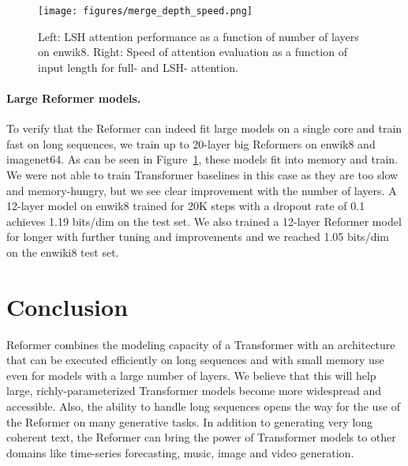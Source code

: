 \begin{figure}[!t]
    \centering
    \texttt{[image: figures/merge\_depth\_speed.png]}
    \caption{Left: LSH attention performance as a function of number of layers on enwik8. 
    Right: Speed of attention evaluation as a function of input length for full- and LSH- attention.}
    \label{fig:layer-curves}
\end{figure}

\paragraph{Large Reformer models.} \label{sec:exp_large}
To verify that the Reformer can indeed fit large models on a single core
and train fast on long sequences, we train up to 20-layer big Reformers on enwik8 and imagenet64.
As can be seen in Figure~\ref{fig:layer-curves}, these models
fit into memory and train. We were not able to train Transformer baselines
in this case as they are too slow and memory-hungry, but we see clear improvement
with the number of layers. A 12-layer model on enwik8 trained for 20K steps with a dropout rate of 0.1 achieves 1.19 bits/dim on the test set. We also trained a 12-layer Reformer model for longer with
further tuning and improvements and we reached 1.05 bits/dim on the enwiki8 test
set.

\section{Conclusion}

Reformer combines the modeling capacity of a Transformer with an architecture that can be executed efficiently on long sequences and with small memory
use even for models with a large number of layers.
We believe that this will help large, richly-parameterized Transformer models become more widespread and accessible. 
Also, the ability to handle long sequences opens the way for the use of
the Reformer on many generative tasks. In addition to generating very long
coherent text, the Reformer can bring the power of Transformer models to other
domains like time-series forecasting, music, image and video generation.

\newpage

